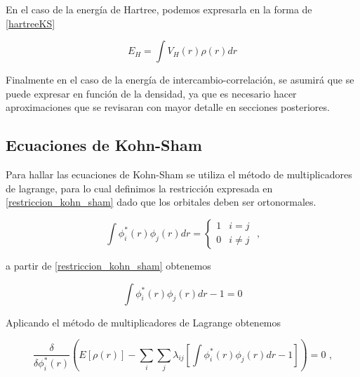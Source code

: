\noindent En el caso de la energ\'ia de Hartree, podemos expresarla en la forma 
de 
\ref{hartreeKS}

\begin{equation} \label{hartreeKS}
    E_{H} = \int V_{H}(r) \rho (r) dr
\end{equation}

\noindent Finalmente en el caso de la energ\'ia de intercambio-correlaci\'on, 
se asumir\'a que se puede expresar en funci\'on de la densidad, ya que es 
necesario hacer aproximaciones que se revisaran con mayor detalle en secciones 
posteriores.


\subsection{Ecuaciones de Kohn-Sham}

Para hallar las ecuaciones de Kohn-Sham se utiliza el m\'etodo de 
multiplicadores de lagrange, para lo cual definimos la restricci\'on expresada 
en \ref{restriccion_kohn_sham} dado que los orbitales deben ser ortonormales.


\begin{equation} \label{restriccion_kohn_sham}
    \int \phi _{i}^{\ast }(r) \phi _{j}(r)dr = \left \{ \begin{array}{ll}
        1 & i=j \\
        0 & i \neq j
        \end{array} \right. \textrm{ ,}
\end{equation}

\noindent a partir de \ref{restriccion_kohn_sham} obtenemos

\begin{equation}
     \int \phi _{i}^{\ast }(r) \phi _{j}(r)dr - 1 = 0
\end{equation}

\noindent Aplicando el m\'etodo de multiplicadores de Lagrange obtenemos

\begin{equation}
    \frac{\delta }{\delta \phi _{i}^{\ast }(r)} \left( E[\rho (r)] - \sum _{i} 
    \sum _{j}     \lambda _{ij} \left[ \int \phi _{i}^{\ast }(r) \phi _{j}(r) 
    dr - 1  \right] \right) = 0 \textrm{ ,}
\end{equation}

